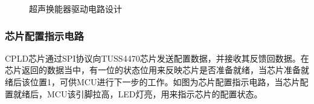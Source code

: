 \begin{figure}[ht]
	\centering
	\caption{超声换能器驱动电路设计}
	\label{超声换能器驱动电路设计}
\end{figure}
    \subsubsection{芯片配置指示电路}
    CPLD芯片通过SPI协议向TUSS4470芯片发送配置数据，并接收其反馈回数据。在芯片返回的数据当中，有一位的状态位用来反映芯片是否准备就绪，当芯片准备就绪后该位置1，可供MCU进行下一步的工作。如图为芯片配置指示电路，当芯片配置就绪后，MCU该引脚拉高，LED灯亮，用来指示芯片的配置状态。
